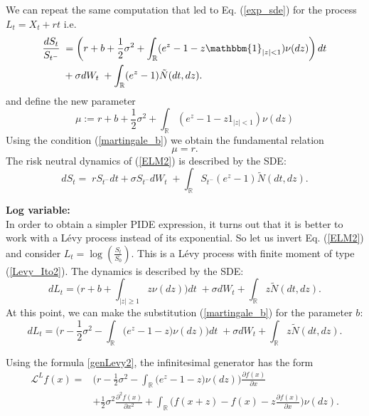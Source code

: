 \documentclass[a4paper,10pt]{article}
\newcommand{\numberset}{\mathbb}
\newcommand{\R}{\numberset{R}}
\newcommand{\LL}{\mathcal{L}}
\begin{document}
We can repeat the same computation that led to Eq. (\ref{exp_sde}) for the process $L_t = X_t + rt$ i.e.
\begin{align} \label{exp_sde_RN}
 \frac{d S_t}{S_{t^-}}  \; &= \left(r + b + \frac{1}{2}\sigma^2 + \int_{\R} ( e^{z} - 1 -z\mathbbm{1}_{|z|<1}) \nu(dz) \right) dt  \\ \nonumber
                          &+  \sigma dW_t \; + \int_{\R} (e^{z} - 1) \tilde N(dt,dz). \nonumber
\end{align}
and define the new parameter
\begin{equation}\label{mu2}
 \mu := r + b + \frac{1}{2}\sigma^2 + \int_{\R} ( e^{z} - 1 -z1_{|z|<1}) \nu(dz)
\end{equation}
Using the condition (\ref{martingale_b}) we obtain the fundamental relation
\begin{equation}\label{mu=r}
 \mu = r.
\end{equation}
The risk neutral dynamics of (\ref{ELM2}) is described by the SDE:
\begin{equation}\label{RN_sde}
 d S_t = \; r S_{t^-} dt +  \sigma S_{t^-} dW_t \; + \int_{\R} S_{t^-} (e^{z} - 1) \tilde N(dt,dz). 
\end{equation}

\noindent
\textbf{Log variable:}\\
In order to obtain a simpler PIDE expression, it turns out that it is better to work with a Lévy process instead of its exponential. 
So let us invert Eq. (\ref{ELM2})
and consider $ L_t = \log \left( \frac{S_t}{S_0} \right)$.
This is a Lévy process with finite moment of type (\ref{Levy_Ito2}).
The dynamics is described by the SDE: 
\begin{equation}\label{SDE_log_var}
 dL_t = \biggl( r + b + \int_{|z|\geq 1}z \nu(dz) \biggr) dt \; + \sigma dW_t + \int_{\R} z \tilde N(dt,dz).
\end{equation} 
At this point, we can make the substitution (\ref{martingale_b}) for the parameter $b$:
\begin{equation}\label{SDE_log_var2}
 dL_t = \biggl( r -\frac{1}{2}\sigma^2 - \int_{\R} \bigl( e^z-1-z \bigr) \nu(dz) \biggr) dt \; + \sigma dW_t + \int_{\R} z \tilde N(dt,dz).
\end{equation} 

Using the formula \ref{genLevy2}, the infinitesimal generator has the form
\begin{align}\label{RN_log_gen}
 \LL^L f(x) =& \biggl( r-\frac{1}{2}\sigma^2 - \int_{\R} \bigl( e^z-1-z \bigr) \nu(dz) \biggr) \frac{\partial f(x)}{\partial x} \\ \nonumber
          &+ \frac{1}{2} \sigma^2 \frac{\partial^2 f(x)}{\partial x^2} 
          + \int_{\R} \biggl( f(x+z)- f(x) - z \frac{\partial f(x)}{\partial x} \biggr) \nu(dz).
\end{align}
\end{document}

